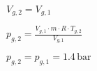\( V_{g,2} = V_{g,1} \)  

\( p_{g,2} = \frac{V_{g,1} \cdot m \cdot R \cdot T_{g,2}}{V_{g,1}} \)  

\( p_{g,2} = p_{g,1} = 1.4 \, \text{bar} \)